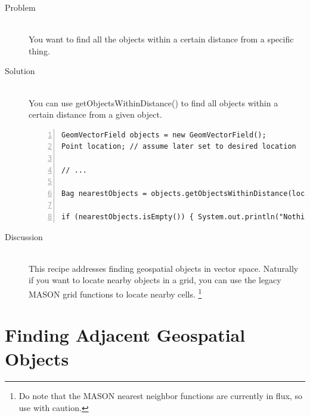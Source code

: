\documentclass[twoside,10pt]{book}
\newcommand\method[1]{\textsf{#1}}
\begin{document}
\begin{description}
\item[Problem]~\\
You want to find all the objects within a certain distance from a
specific thing.

\item[Solution]~\\
You can use \method{getObjectsWithinDistance()} to find all
objects within a certain distance from a given object.
\begin{Verbatim}[frame=lines,framesep=5mm,numbers=left,commandchars=+\[\]]
GeomVectorField objects = new GeomVectorField();
Point location; // assume later set to desired location

// ...
	
Bag nearestObjects = objects.getObjectsWithinDistance(location,distance);

if (nearestObjects.isEmpty()) { System.out.println("Nothing nearby"); }
\end{Verbatim}

\item[Discussion]~\\
This recipe addresses finding geospatial objects in vector space.
Naturally if you want to locate nearby objects in a grid, you can use
the legacy MASON grid functions to locate nearby cells. \footnote{Do
  note that the MASON nearest neighbor functions are currently in
  flux, so use with caution.}
\end{description}


\section{Finding Adjacent Geospatial Objects}
\label{sec:findingadjacent}
\end{document}
